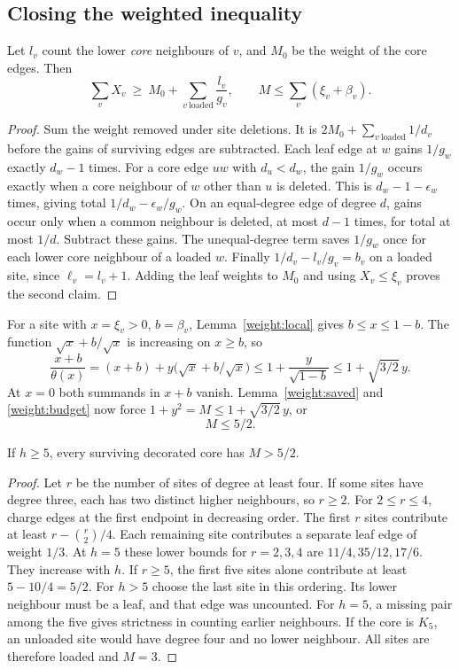 \subsection{Closing the weighted inequality}
\begin{lemma}\label{weight:saved}
Let $l_v$ count the lower \emph{core} neighbours of $v$, and $M_0$ be the weight of the core edges. Then
\[
 \sum_v X_v\ \ge\ M_0+\sum_{v\ \mathrm{loaded}}\frac{l_v}{g_v},
 \qquad M\le\sum_v(\xi_v+\beta_v).
\]
\end{lemma}
\begin{proof}
Sum the weight removed under site deletions. It is $2M_0+\sum_{v\ \mathrm{loaded}}1/d_v$ before the gains of surviving edges are subtracted. Each leaf edge at $w$ gains $1/g_w$ exactly $d_w-1$ times. For a core edge $uw$ with $d_u<d_w$, the gain $1/g_w$ occurs exactly when a core neighbour of $w$ other than $u$ is deleted. This is $d_w-1-\epsilon_w$ times, giving total $1/d_w-\epsilon_w/g_w$. On an equal-degree edge of degree $d$, gains occur only when a common neighbour is deleted, at most $d-1$ times, for total at most $1/d$. Subtract these gains. The unequal-degree term saves $1/g_w$ once for each lower core neighbour of a loaded $w$. Finally $1/d_v-l_v/g_v=b_v$ on a loaded site, since $\ell_v=l_v+1$. Adding the leaf weights to $M_0$ and using $X_v\le\xi_v$ proves the second claim.
\end{proof}
For a site with $x=\xi_v>0$, $b=\beta_v$, Lemma~\ref{weight:local} gives $b\le x\le1-b$. The function $\sqrt{x}+b/\sqrt{x}$ is increasing on $x\ge b$, so
\[
 \frac{x+b}{\theta(x)}
   =(x+b)+y\bigl(\sqrt{x}+b/\sqrt{x}\bigr)
   \le1+\frac{y}{\sqrt{1-b}}\le1+\sqrt{3/2}\,y .
\]
At $x=0$ both summands in $x+b$ vanish. Lemma~\ref{weight:saved} and \eqref{weight:budget} now force $1+y^2=M\le1+\sqrt{3/2}\,y$, or
\begin{equation}M\le 5/2.\label{weight:fivehalf}\end{equation}
\begin{lemma} If $h\ge5$, every surviving decorated core has $M>5/2$.\end{lemma}
\begin{proof}
Let $r$ be the number of sites of degree at least four. If some sites have degree three, each has two distinct higher neighbours, so $r\ge2$. For $2\le r\le4$, charge edges at the first endpoint in decreasing order. The first $r$ sites contribute at least $r-\binom r2/4$. Each remaining site contributes a separate leaf edge of weight $1/3$. At $h=5$ these lower bounds for $r=2,3,4$ are $11/4,35/12,17/6$. They increase with $h$. If $r\ge5$, the first five sites alone contribute at least $5-10/4=5/2$. For $h>5$ choose the last site in this ordering. Its lower neighbour must be a leaf, and that edge was uncounted. For $h=5$, a missing pair among the five gives strictness in counting earlier neighbours. If the core is $K_5$, an unloaded site would have degree four and no lower neighbour. All sites are therefore loaded and $M=3$.
\end{proof}

